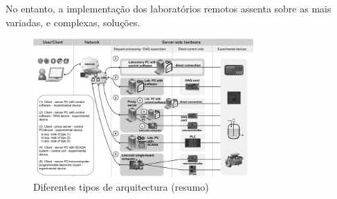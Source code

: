 No entanto, a implementação dos laboratórios remotos assenta sobre as mais variadas, e complexas, soluções.
\begin{figure}[hbtp]
    \centering
    \includegraphics[width=0.75\textwidth]{figures/kaluz.png}
    \caption{Diferentes tipos de arquitectura (resumo)}
    \label{fig:diferentestiposarq}
\end{figure}

